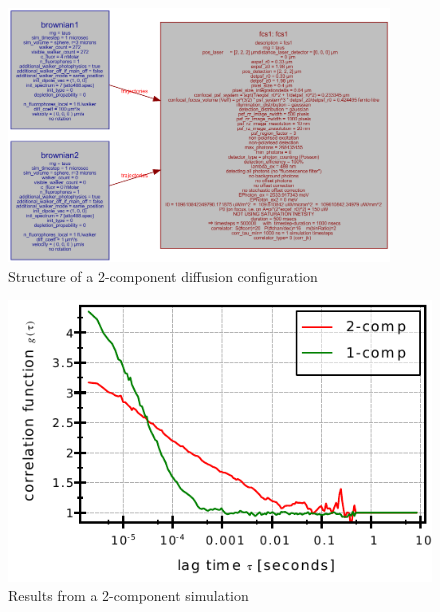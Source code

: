 \begin{figure}[b!]
	\centering
		\includegraphics[width=0.9\textwidth]{pic/simple2comp_struct.png}
	\caption{Structure of a 2-component diffusion configuration}
	\label{fig:simple2comp_struct}
\end{figure}



\begin{figure}[t!]
	\centering
		\includegraphics{pic/simple2comp_acf.pdf}
	\caption{Results from a 2-component simulation}
	\label{fig:simple2comp_acf}
\end{figure}
